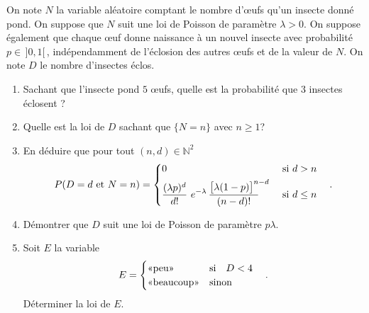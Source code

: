 \documentclass[12pt,reqno]{amsart}
\begin{document}
\begin{exo}

 On note $ N$ la variable aléatoire comptant le nombre d'œufs qu'un insecte donné pond. On suppose que $N$ suit une loi de Poisson de paramètre $\lambda>0$. On suppose également que chaque œuf donne naissance à un nouvel insecte avec probabilité $p \in \,]0,1[$\,, indépendamment de l'éclosion des autres œufs et de la valeur de $N$. On note $D$ le nombre d'insectes éclos.
  \begin{enumerate}

    \item Sachant que l'insecte pond $5$ œufs, quelle est la probabilité que $3$ insectes éclosent ?

    \item Quelle est la loi de $D$ sachant que $\{N=n\}$ avec $n\ge 1$?

    \item En déduire que pour tout $(n, d)\in\mathbb{N}^2$
      $$
        P(D = d \text{ et } N = n)=
          \begin{dcases}
            0 & \text{ si } d>n \\
            \frac{(\lambda p)^d}{d!}
            ~e^{-\lambda}\,
            \frac{\big[\lambda (1-p)\big]^{\makebox[4pt][l]{$\scriptstyle n-d$}}}{(n-d)!}\quad
              & \text{ si } d\le n
          \end{dcases}\quad.
      $$

    \item Démontrer que $D$ suit une loi de Poisson de paramètre $p\lambda$.

    \item Soit $E$ la variable
      $$
        E=
          \begin{cases}
            \text{«peu»} & \text{si\quad} D < 4\\
            \text{«beaucoup»} & \text{sinon}
          \end{cases}\quad.
      $$
      Déterminer la loi de $E$.

  \end{enumerate}

\end{exo}
\end{document}
